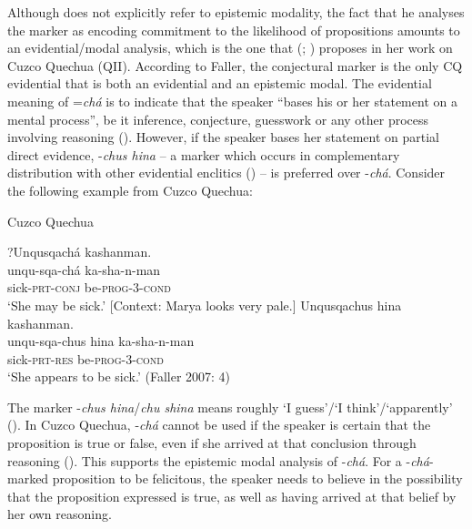 \documentclass[output=paper]{langscibook}
\begin{document}
Although \citeauthor{Floyd1997} does not explicitly refer to epistemic modality, the fact that he analyses the marker as encoding commitment to the likelihood of propositions amounts to an evidential/modal analysis, which is the one that \citeauthor{Faller2002} (\citeyear{Faller2002}; \citeyear{Faller2007}) proposes in her work on Cuzco Quechua (QII). According to Faller, the conjectural marker is the only CQ evidential that is both an evidential and an epistemic modal. The evidential meaning of =\textit{chá} is to indicate that the speaker “bases his or her statement on a mental process”, be it inference, conjecture, guesswork or any other process involving reasoning (\citealt[176]{Faller2002}). However, if  the speaker bases her statement on partial direct evidence, -\textit{chus hina} – a marker which occurs in complementary distribution with other evidential enclitics (\citealt{Faller2006}) – is preferred over -\textit{chá}. Consider the following example from Cuzco Quechua:


\begin{exe}
	\ex Cuzco Quechua\label{ex:kg2}
	\begin{xlist}
		\ex 
		\glll ?Unqusqachá kashanman.\\
		unqu-sqa-chá ka-sha-n-man\\
		sick-\textsc{prt}-\textsc{conj} be-\textsc{prog}-3-\textsc{cond}\\
		\trans ‘She may be sick.’ [Context: Marya looks very pale.]
		\ex 
		\glll Unqusqachus hina kashanman.\\
		unqu-sqa-chus hina ka-sha-n-man\\
        sick-\textsc{prt}-\textsc{res} {} be-\textsc{prog}-3-\textsc{cond}\\
        \trans ‘She appears to be sick.’ (Faller 2007: 4)
	\end{xlist}
\end{exe}

The marker -\textit{chus hina}/\textit{chu shina} means roughly ‘I guess’/‘I think’/‘apparently’ (\citealt[3]{Faller2006}). In Cuzco Quechua, -\textit{chá} cannot be used if the speaker is certain that the proposition is true or false, even if she arrived at that conclusion through reasoning (\citealt[5]{Faller2007}). This supports the epistemic modal analysis of -\textit{chá}. For a -\textit{chá}-marked proposition to be felicitous, the speaker needs to believe in the possibility that the proposition expressed is true, as well as having arrived at that belief by her own reasoning.
\end{document}
